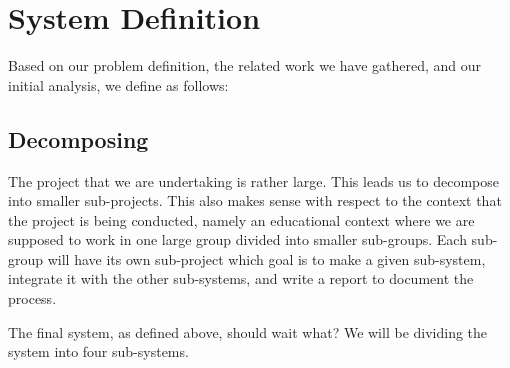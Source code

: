 \section{System Definition}
Based on our problem definition, the related work we have gathered, and our initial analysis, we define \system as follows:












\subsection{Decomposing \system}
\label{sub:decomposingSys}
The project that we are undertaking is rather large.
This leads us to decompose into smaller sub-projects.
This also makes sense with respect to the context that the project is being conducted, namely an educational context where we are supposed to work in one large group divided into smaller sub-groups.
Each sub-group will have its own sub-project which goal is to make a given sub-system, integrate it with the other sub-systems, and write a report to document the process.

The final system, as defined above, should wait what?
We will be dividing the system into four sub-systems.











